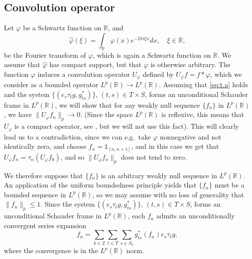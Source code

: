 \documentclass[reqno,a4paper,12pt]{amsart}
\numberwithin{equation}{section}
\numberwithin{figure}{section}
\newcommand\R{\mathbb{R}}
\newcommand\Z{\mathbb{Z}}
\newcommand\1{\mathds{1}}
\newcommand{\pphi}{\varphi}
\newcommand{\TTT}{T}
\newcommand{\SSS}{S}
\newcommand{\ts}{\tau}
\renewcommand\le{\leqslant}
\newcommand{\ft}[1]{\widehat{#1}}
\theoremstyle{plain}
\theoremstyle{definition}
\begin{document}
\subsection{Convolution operator}
Let $\pphi$ be a Schwartz function on $\R$, and
\begin{equation}
\ft{\pphi}(\xi) =  \int_{\R} \pphi(x) e^{-2 \pi i \xi x} dx,
\quad  \xi \in \R,
\end{equation}
be the Fourier transform of $\pphi$, which is again
a Schwartz function on $\R$. We assume that
$\ft{\pphi}$ has compact support, but that
$\pphi$ is otherwise arbitrary. 
The function $\pphi$  induces a convolution operator $U_\pphi$ 
defined by $U_\pphi f = f\ast\pphi$,
which we consider as a bounded operator $L^p(\R) \to L^p(\R)$. 
Assuming that \eqref{eq:t.a} holds and the system
$\{(e_s \ts_t g, g_{ts}^*)\}$, $(t,s) \in  \TTT \times \SSS$, forms
an unconditional Schauder frame in $L^p(\R)$,
we will show that for any weakly null sequence 
$\{ f_n \}$ in $L^p(\R)$, we have
$\|U_\pphi f_n\|_p \to 0$.
(Since the space $L^p(\R)$ is reflexive, this means that 
$U_\pphi$ is a compact operator, see
\cite[Chapter VI, Proposition 3.3]{Con90},
but we will not use this fact).
This will clearly lead us to a contradiction, since we can e.g.\ take $\pphi$ 
nonnegative and not identically zero, 
and choose $f_n = \1_{[n,n+1]}$, and in this case 
we get that $U_\pphi f_n = \ts_n (U_\pphi f_0)$, and so 
$\| U_\pphi f_n \|_p$  does not tend to zero.


We therefore suppose that $\{ f_n \}$ is an arbitrary
 weakly null sequence in $L^p(\R)$. 
An application of the uniform boundedness principle yields that
 $\{ f_n \}$ must be a bounded sequence  in $L^p(\R)$, so we may assume
with no loss of generality that $\|f_n\|_p \le 1$. 
Since the system 
$\{(e_s \ts_t g, g_{ts}^*)\}$, $(t,s) \in  \TTT \times \SSS$, forms
an unconditional Schauder frame in $L^p(\R)$,
each $f_n$ admits an unconditionally convergent series expansion
\begin{equation}
\label{eq:fn.ucs}
f_n =  \sum_{k\in\Z} \sum_{t\in \TTT} \sum_{s\in \SSS_k}  
 g_{ts}^* (f_n)  e_s \ts_t g,
\end{equation}
where the convergence is in the $L^p(\R)$ norm.
\end{document}
